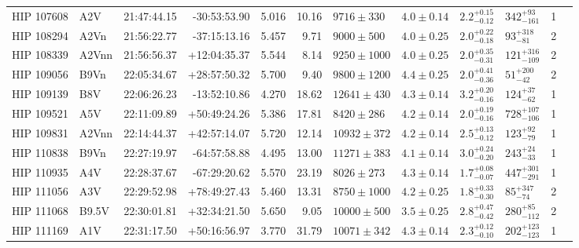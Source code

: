 \begin{tiny}
\begin{longtable}{|l|lrrrrllllll|}
  HIP 107608 &      A2V &    21:47:44.15 &   -30:53:53.90 &   5.016 &     10.16 &    $9716 \pm 330$ &  $4.0 \pm 0.14$ &  $2.2^{+0.15}_{-0.12}$ &    $342^{+93}_{-161}$ &       1 \\
  HIP 108294 &     A2Vn &    21:56:22.77 &   -37:15:13.16 &   5.457 &      9.71 &    $9000 \pm 500$ &  $4.0 \pm 0.25$ &  $2.0^{+0.22}_{-0.18}$ &     $93^{+318}_{-81}$ &       2 \\
  HIP 108339 &    A2Vnn &    21:56:56.37 &   +12:04:35.37 &   5.544 &      8.14 &   $9250 \pm 1000$ &  $4.0 \pm 0.25$ &  $2.0^{+0.35}_{-0.31}$ &   $121^{+316}_{-109}$ &       2 \\
  HIP 109056 &     B9Vn &    22:05:34.67 &   +28:57:50.32 &   5.700 &      9.40 &   $9800 \pm 1200$ &  $4.4 \pm 0.25$ &  $2.0^{+0.41}_{-0.36}$ &     $51^{+200}_{-42}$ &       2 \\
  HIP 109139 &      B8V &    22:06:26.23 &   -13:52:10.86 &   4.270 &     18.62 &   $12641 \pm 430$ &  $4.3 \pm 0.14$ &  $3.2^{+0.20}_{-0.16}$ &     $124^{+37}_{-62}$ &       1 \\
  HIP 109521 &      A5V &    22:11:09.89 &   +50:49:24.26 &   5.386 &     17.81 &    $8420 \pm 286$ &  $4.2 \pm 0.14$ &  $2.0^{+0.19}_{-0.16}$ &   $728^{+107}_{-106}$ &       1 \\
  HIP 109831 &    A2Vnn &    22:14:44.37 &   +42:57:14.07 &   5.720 &     12.14 &   $10932 \pm 372$ &  $4.2 \pm 0.14$ &  $2.5^{+0.13}_{-0.12}$ &     $123^{+92}_{-79}$ &       1 \\
  HIP 110838 &     B9Vn &    22:27:19.97 &   -64:57:58.88 &   4.495 &     13.00 &   $11271 \pm 383$ &  $4.1 \pm 0.14$ &  $3.0^{+0.24}_{-0.20}$ &     $243^{+24}_{-33}$ &       1 \\
  HIP 110935 &      A4V &    22:28:37.67 &   -67:29:20.62 &   5.570 &     23.19 &    $8026 \pm 273$ &  $4.3 \pm 0.14$ &  $1.7^{+0.08}_{-0.07}$ &   $447^{+301}_{-291}$ &       1 \\
  HIP 111056 &      A3V &    22:29:52.98 &   +78:49:27.43 &   5.460 &     13.31 &   $8750 \pm 1000$ &  $4.2 \pm 0.25$ &  $1.8^{+0.33}_{-0.30}$ &     $85^{+347}_{-74}$ &       2 \\
  HIP 111068 &    B9.5V &    22:30:01.81 &   +32:34:21.50 &   5.650 &      9.05 &   $10000 \pm 500$ &  $3.5 \pm 0.25$ &  $2.8^{+0.47}_{-0.42}$ &    $280^{+85}_{-112}$ &       2 \\
  HIP 111169 &      A1V &    22:31:17.50 &   +50:16:56.97 &   3.770 &     31.79 &   $10071 \pm 342$ &  $4.3 \pm 0.14$ &  $2.3^{+0.12}_{-0.10}$ &   $202^{+123}_{-123}$ &       1 \\

\end{longtable}
\end{tiny}
